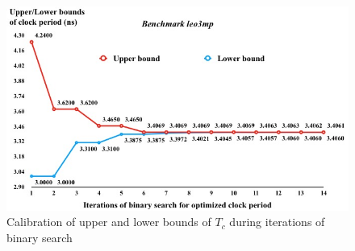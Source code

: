 \begin{figure}
    \centering
    \includegraphics[width=0.8\columnwidth]{leo3mp_Tc.png} %
    \caption{Calibration of upper and lower bounds of $T_{c}$ during iterations of binary search}
    \label{fig:Tc}
\end{figure}